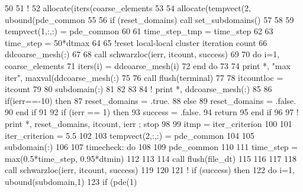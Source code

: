 \begin{DoxyCode}
50 
51 \textcolor{comment}{!       }
52         \textcolor{keyword}{allocate}(iters(coarse_elements%
53 
54         \textcolor{keyword}{allocate}(tempvect(2, ubound(pde_common%
55         
56         \textcolor{keywordflow}{if} (reset\_domains) \textcolor{keyword}{call }set_subdomains()
57                 
58 
59         tempvect(1,:,:) = pde_common%
60                 
61         time\_step\_tmp = time_step
62         
63         time_step = 50*dtmax
64         
65         \textcolor{comment}{!reset local-local cluster iteration count}
66         ddcoarse_mesh(:)%
67         
68         \textcolor{keyword}{call }schwarzloc(ierr, itcount, success)
69         
70         \textcolor{keywordflow}{do} i=1, coarse_elements%
71           iters(i) = ddcoarse_mesh(i)%
72 \textcolor{keywordflow}{        end do}
73         
74         print *, \textcolor{stringliteral}{"max iter"},  maxval(ddcoarse_mesh(:)%
75         
76         \textcolor{keyword}{call }flush(terminal)
77         
78         itcountloc = itcount
79         
80         subdomain(:)%
81         
82 
83         
84 \textcolor{comment}{!       print *, ddcoarse\_mesh(:)%
85         
86           \textcolor{keywordflow}{if}(ierr==-10) \textcolor{keywordflow}{then}
87             reset\_domains = .true.
88           \textcolor{keywordflow}{else}
89             reset\_domains = .false.
90 \textcolor{keywordflow}{          end if}
91           
92          \textcolor{keywordflow}{if} (ierr == 1) \textcolor{keywordflow}{then}
93           success = .false.
94           \textcolor{keywordflow}{return}
95 \textcolor{keywordflow}{         end if}
96         
97 \textcolor{comment}{!         print *, reset\_domains, itcount, ierr ; stop}
98         
99         itmp = iter_criterion
100          
101         iter_criterion = 5.5
102         
103         tempvect(2,:,:) = pde_common%
104         
105         subdomain(:)%
106 
107         timecheck: \textcolor{keywordflow}{do}
108         
109           pde_common%
110           
111           time_step = max(0.5*time_step, 0.95*dtmin)
112           
113           
114           \textcolor{keyword}{call }flush(file_dt)
115           
116           
117            
118           \textcolor{keyword}{call }schwarzloc(ierr, itcount, success)
119 
120           
121 \textcolor{comment}{!         if (success) then}
122             \textcolor{keywordflow}{do} i=1, ubound(subdomain,1)
123               \textcolor{keywordflow}{if} (pde(1)%
}
\end{DoxyCode}
